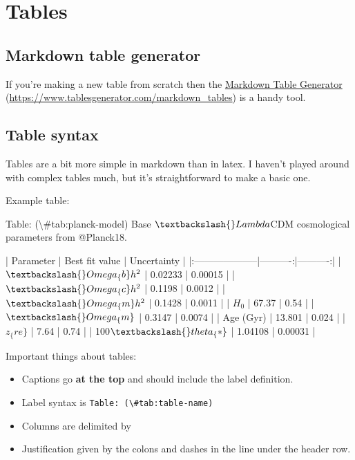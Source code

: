 \documentclass[]{book}
\newenvironment{Shaded}{\begin{snugshade}}{\end{snugshade}}
\newcommand{\NormalTok}[1]{#1}
\providecommand{\tightlist}{%
  \setlength{\itemsep}{0pt}\setlength{\parskip}{0pt}}
\begin{document}
\hypertarget{sec:tables}{%
\chapter{Tables}\label{sec:tables}}

\hypertarget{sec:md-tab-gen}{%
\section{Markdown table generator}\label{sec:md-tab-gen}}

If you're making a new table from scratch then the \protect\hyperlink{sec:md-tab-gen}{Markdown Table Generator} (\url{https://www.tablesgenerator.com/markdown_tables}) is a handy tool.

\hypertarget{sec:tab-syntax}{%
\section{Table syntax}\label{sec:tab-syntax}}

Tables are a bit more simple in markdown than in latex. I haven't played around with complex tables much, but it's straightforward to make a basic one.

Example table:

\begin{Shaded}
\begin{Highlighting}[]
\NormalTok{Table: (\textbackslash{}#tab:planck-model) Base $\textbackslash{}Lambda$CDM cosmological parameters from @Planck18. }

\NormalTok{| Parameter | Best fit value     | Uncertainty |}
\NormalTok{|:--------------------|----------:|----------:|}
\NormalTok{| $\textbackslash{}Omega_\{b\}h^2$ | 0.02233 | 0.00015 |}
\NormalTok{| $\textbackslash{}Omega_\{c\}h^2$ | 0.1198 | 0.0012 |}
\NormalTok{| $\textbackslash{}Omega_\{m\}h^2$ | 0.1428 | 0.0011 |}
\NormalTok{| $H_0$ | 67.37 | 0.54 |}
\NormalTok{| $\textbackslash{}Omega_\{m\}$ | 0.3147 | 0.0074 |}
\NormalTok{| Age (Gyr) | 13.801 | 0.024 | }
\NormalTok{| $z_\{re\}$ | 7.64 |  0.74 | }
\NormalTok{| 100$\textbackslash{}theta_\{*\}$ | 1.04108 | 0.00031 | }
\end{Highlighting}
\end{Shaded}

Important things about tables:

\begin{itemize}
\tightlist
\item
  Captions go \textbf{at the top} and should include the label definition.
\item
  Label syntax is \texttt{Table:\ (\textbackslash{}\#tab:table-name)}
\item
  Columns are delimited by \texttt{\textbar{}}
\item
  Justification given by the colons and dashes in the line under the header row.
\end{itemize}
\end{document}
